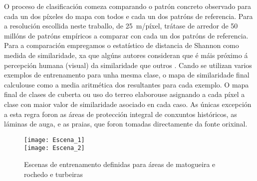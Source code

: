 \documentclass[11pt,a4paper]{article}
\begin{document}
O proceso de clasificación comeza comparando o patrón concreto observado para cada un dos píxeles do mapa con todos e cada un dos patróns de referencia. Para a resolución escollida neste traballo, de 25~m/píxel, trátase de arredor de 50 millóns de patróns empíricos a comparar con cada un dos patróns de referencia. Para a comparación empregamos o estatístico de distancia de Shannon \citep{Cha2007} como medida de similaridade, xa que algúns autores consideran que é máis próximo á percepción humana (visual) da similaridade que outros \citep{Jasiewicz2014104}. Cando se utilizan varios exemplos de entrenamento para unha mesma clase, o mapa de similaridade final calculouse como a media aritmética dos resultantes para cada exemplo. O mapa final de clases de cuberta ou uso do terreo elaborouse asignando a cada píxel a clase con maior valor de similaridade asociado en cada caso. As únicas excepción a esta regra foron as áreas de protección integral de conxuntos históricos, as láminas de auga, e as praias, que foron tomadas directamente da fonte orixinal.






\begin{figure}
\caption{Escenas de entrenamento definidas para áreas de matogueira e rochedo e turbeiras}\label{fig:escenas1}
\texttt{[image: Escena\_1]}\\
\texttt{[image: Escena\_2]}
\end{figure}
\end{document}
